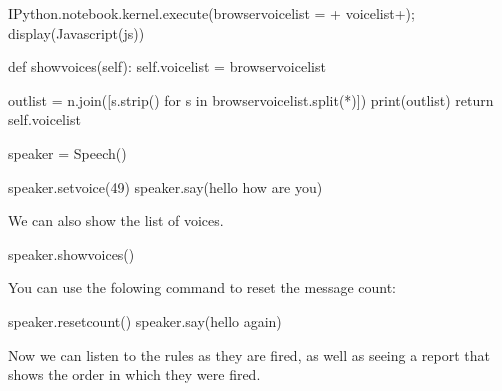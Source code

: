\documentclass[letterpaper,10pt,english]{sphinxmanual}
\begin{document}
{{\begin{sphinxVerbatim}[commandchars=\\\{\}]
IPython.notebook.kernel.execute(\PYGZdq{}\PYGZus{}browser\PYGZus{}voicelist = \PYGZsq{}\PYGZdq{}+ voicelist+\PYGZdq{}\PYGZsq{}\PYGZdq{});
        \PYGZsq{}\PYGZsq{}\PYGZsq{}
        display(Javascript(js))

    def show\PYGZus{}voices(self):
        self.voicelist = \PYGZus{}browser\PYGZus{}voicelist

        outlist = \PYGZsq{}\PYGZbs{}n\PYGZsq{}.join([s.strip() for s in \PYGZus{}browser\PYGZus{}voicelist.split(\PYGZsq{}*\PYGZsq{})])
        print(outlist)
        \PYGZsh{}return self.voicelist
\end{sphinxVerbatim}
}

{
\begin{sphinxVerbatim}[commandchars=\\\{\}]
\llap{\color{nbsphinxin}[ ]:\,\hspace{\fboxrule}\hspace{\fboxsep}}speaker = Speech()

\PYGZsh{}speaker.set\PYGZus{}voice(49)
speaker.say(\PYGZsq{}hello how are you\PYGZsq{})
\end{sphinxVerbatim}
}

We can also show the list of voices.

{
\begin{sphinxVerbatim}[commandchars=\\\{\}]
\llap{\color{nbsphinxin}[ ]:\,\hspace{\fboxrule}\hspace{\fboxsep}}speaker.show\PYGZus{}voices()
\end{sphinxVerbatim}
}

You can use the folowing command to reset the message count:

{
\begin{sphinxVerbatim}[commandchars=\\\{\}]
\llap{\color{nbsphinxin}[ ]:\,\hspace{\fboxrule}\hspace{\fboxsep}}speaker.reset\PYGZus{}count()
speaker.say(\PYGZsq{}hello again\PYGZsq{})
\end{sphinxVerbatim}
}

Now we can listen to the rules as they are fired, as well as seeing a report that shows the order in which they were fired.

}
\end{document}
